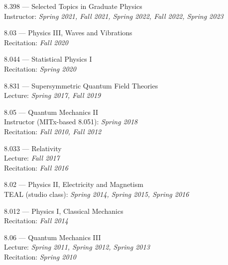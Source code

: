\bbl
\item 8.398 --- Selected Topics in Graduate Physics
\\ Instructor: \emph{Spring 2021, Fall 2021, Spring 2022, Fall 2022, Spring 2023}
\item 8.03 --- Physics III, Waves and Vibrations
\\ Recitation: \emph{Fall 2020}
\item 8.044 --- Statistical Physics I
\\ Recitation: \emph{Spring 2020}
\item 8.831 --- Supersymmetric Quantum Field Theories
\\ Lecture: \emph{Spring 2017, Fall 2019}
\item 8.05 --- Quantum Mechanics II
\\ Instructor (MITx-based 8.051): \emph{Spring 2018}
\\ Recitation: \emph{Fall 2010, Fall 2012}
\item 8.033 --- Relativity
\\ Lecture: \emph{Fall 2017}
\\ Recitation: \emph{Fall 2016}
\item 8.02 --- Physics II, Electricity and Magnetism
\\ TEAL (studio class): \emph{Spring 2014, Spring 2015, Spring 2016}
\item 8.012 --- Physics I, Classical Mechanics
\\ Recitation: \emph{Fall 2014}
\item 8.06 --- Quantum Mechanics III
\\ Lecture: \emph{Spring 2011, Spring 2012, Spring 2013}
\\ Recitation: \emph{Spring 2010}
\el
